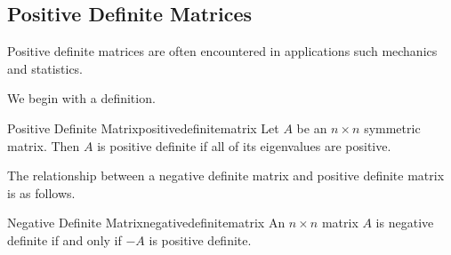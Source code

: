 \subsection{Positive Definite Matrices}

Positive definite matrices are often encountered in applications such mechanics and statistics.

We begin with a definition.

\begin{definition}{Positive Definite Matrix}{positivedefinitematrix}
Let $A$ be an $n \times n$ symmetric matrix. Then $A$ is positive definite if all of its eigenvalues are positive.
\end{definition}

The relationship between a negative definite matrix and positive definite matrix is as follows. 

\begin{lemma}{Negative Definite Matrix}{negativedefinitematrix}
An $n\times n$ matrix $A$ is negative definite if and only if $-A$ is
positive definite.
\end{lemma}


